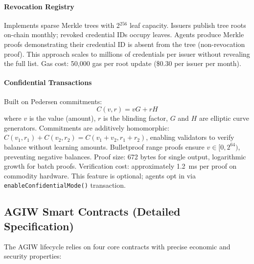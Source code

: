 \documentclass[11pt]{article}
\begin{document}
\begin{CJK}{UTF8}{min}
\paragraph{Revocation Registry} Implements sparse Merkle trees with 2$^{256}$ leaf capacity. Issuers publish tree roots on-chain monthly; revoked credential IDs occupy leaves. Agents produce Merkle proofs demonstrating their credential ID is absent from the tree (non-revocation proof). This approach scales to millions of credentials per issuer without revealing the full list. Gas cost: 50,000 gas per root update (\$0.30 per issuer per month).

\paragraph{Confidential Transactions} Built on Pedersen commitments:
\begin{equation}
C(v, r) = vG + rH
\end{equation}
where $v$ is the value (amount), $r$ is the blinding factor, $G$ and $H$ are elliptic curve generators. Commitments are additively homomorphic: $C(v_1, r_1) + C(v_2, r_2) = C(v_1 + v_2, r_1 + r_2)$, enabling validators to verify balance without learning amounts. Bulletproof range proofs ensure $v \in [0, 2^{64})$, preventing negative balances. Proof size: 672 bytes for single output, logarithmic growth for batch proofs. Verification cost: approximately 1.2~ms per proof on commodity hardware. This feature is optional; agents opt in via \texttt{enableConfidentialMode()} transaction.

\subsection{AGIW Smart Contracts (Detailed Specification)}
\label{sec:agiw-contracts}
The AGIW lifecycle relies on four core contracts with precise economic and security properties:


\end{CJK}
\end{document}
